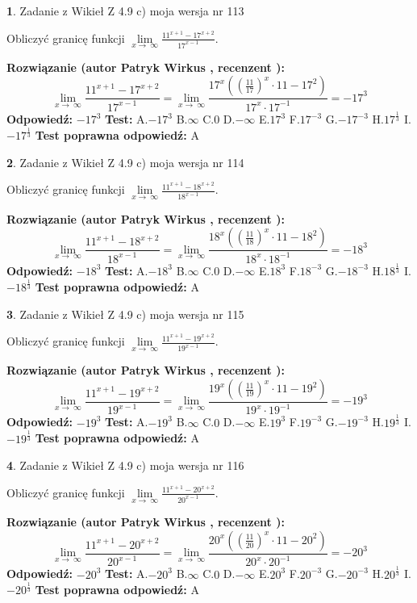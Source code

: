 \documentclass[12pt, a4paper]{article}
\theoremstyle{definition} %
\newtheorem{zad}{}
\newcommand{\zadStart}[1]{\begin{zad}#1\newline}
\newcommand{\zadStop}{\end{zad}}
\newcommand{\rozwStart}[2]{\noindent \textbf{Rozwiązanie (autor #1 , recenzent #2): }\newline}
\newcommand{\rozwStop}{\newline}
\newcommand{\odpStart}{\noindent \textbf{Odpowiedź:}\newline}
\newcommand{\odpStop}{\newline}
\newcommand{\testStart}{\noindent \textbf{Test:}\newline}
\newcommand{\testStop}{\newline}
\newcommand{\kluczStart}{\noindent \textbf{Test poprawna odpowiedź:}\newline}
\newcommand{\kluczStop}{\newline}
\begin{document}
\zadStart{Zadanie z Wikieł Z 4.9 c) moja wersja nr 113}


Obliczyć granicę funkcji  $\lim\limits_{x\to\ \infty}\frac{11^{x+1}-17^{x+2}}{17^{x-1}}$.
\zadStop
\rozwStart{Patryk Wirkus}{}
$$\lim\limits_{x\to\ \infty}\frac{11^{x+1}-17^{x+2}}{17^{x-1}}=\lim\limits_{x\to\ \infty}\frac{17^{x}((\frac{11}{17})^{x}\cdot 11 -17^{2})}{17^{x}\cdot 17^{-1}} = -17^{3}$$
\rozwStop
\odpStart
$-17^{3}$
\odpStop
\testStart
A.$-17^{3}$ B.$\infty$ C.$0$ D.$-\infty$ E.$17^{3}$
F.$17^{-3}$ G.$-17^{-3}$
H.$17^{\frac{1}{3}}$
I.$-17^{\frac{1}{3}}$
\testStop
\kluczStart
A
\kluczStop



\zadStart{Zadanie z Wikieł Z 4.9 c) moja wersja nr 114}


Obliczyć granicę funkcji  $\lim\limits_{x\to\ \infty}\frac{11^{x+1}-18^{x+2}}{18^{x-1}}$.
\zadStop
\rozwStart{Patryk Wirkus}{}
$$\lim\limits_{x\to\ \infty}\frac{11^{x+1}-18^{x+2}}{18^{x-1}}=\lim\limits_{x\to\ \infty}\frac{18^{x}((\frac{11}{18})^{x}\cdot 11 -18^{2})}{18^{x}\cdot 18^{-1}} = -18^{3}$$
\rozwStop
\odpStart
$-18^{3}$
\odpStop
\testStart
A.$-18^{3}$ B.$\infty$ C.$0$ D.$-\infty$ E.$18^{3}$
F.$18^{-3}$ G.$-18^{-3}$
H.$18^{\frac{1}{3}}$
I.$-18^{\frac{1}{3}}$
\testStop
\kluczStart
A
\kluczStop



\zadStart{Zadanie z Wikieł Z 4.9 c) moja wersja nr 115}


Obliczyć granicę funkcji  $\lim\limits_{x\to\ \infty}\frac{11^{x+1}-19^{x+2}}{19^{x-1}}$.
\zadStop
\rozwStart{Patryk Wirkus}{}
$$\lim\limits_{x\to\ \infty}\frac{11^{x+1}-19^{x+2}}{19^{x-1}}=\lim\limits_{x\to\ \infty}\frac{19^{x}((\frac{11}{19})^{x}\cdot 11 -19^{2})}{19^{x}\cdot 19^{-1}} = -19^{3}$$
\rozwStop
\odpStart
$-19^{3}$
\odpStop
\testStart
A.$-19^{3}$ B.$\infty$ C.$0$ D.$-\infty$ E.$19^{3}$
F.$19^{-3}$ G.$-19^{-3}$
H.$19^{\frac{1}{3}}$
I.$-19^{\frac{1}{3}}$
\testStop
\kluczStart
A
\kluczStop



\zadStart{Zadanie z Wikieł Z 4.9 c) moja wersja nr 116}


Obliczyć granicę funkcji  $\lim\limits_{x\to\ \infty}\frac{11^{x+1}-20^{x+2}}{20^{x-1}}$.
\zadStop
\rozwStart{Patryk Wirkus}{}
$$\lim\limits_{x\to\ \infty}\frac{11^{x+1}-20^{x+2}}{20^{x-1}}=\lim\limits_{x\to\ \infty}\frac{20^{x}((\frac{11}{20})^{x}\cdot 11 -20^{2})}{20^{x}\cdot 20^{-1}} = -20^{3}$$
\rozwStop
\odpStart
$-20^{3}$
\odpStop
\testStart
A.$-20^{3}$ B.$\infty$ C.$0$ D.$-\infty$ E.$20^{3}$
F.$20^{-3}$ G.$-20^{-3}$
H.$20^{\frac{1}{3}}$
I.$-20^{\frac{1}{3}}$
\testStop
\kluczStart
A
\kluczStop
\end{document}
